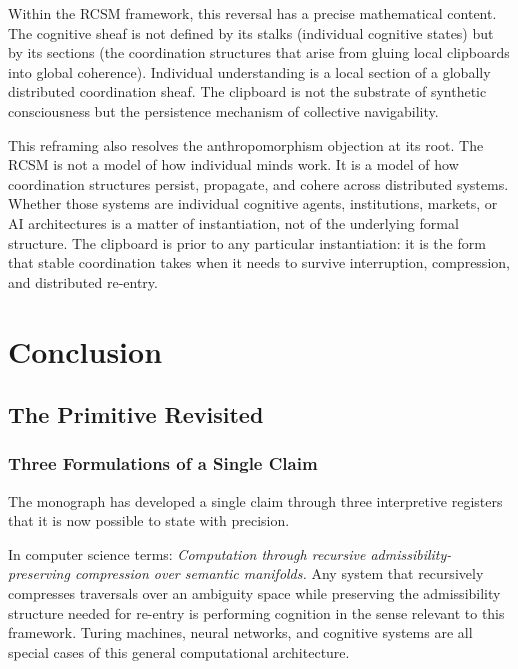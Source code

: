 \documentclass[12pt,oneside]{book}
\theoremstyle{plain}
\theoremstyle{definition}
\theoremstyle{plain}
\begin{document}
Within the RCSM framework, this reversal has a precise mathematical content. The cognitive sheaf is not defined by its stalks (individual cognitive states) but by its sections (the coordination structures that arise from gluing local clipboards into global coherence). Individual understanding is a local section of a globally distributed coordination sheaf. The clipboard is not the substrate of synthetic consciousness but the persistence mechanism of collective navigability.

This reframing also resolves the anthropomorphism objection at its root. The RCSM is not a model of how individual minds work. It is a model of how coordination structures persist, propagate, and cohere across distributed systems. Whether those systems are individual cognitive agents, institutions, markets, or AI architectures is a matter of instantiation, not of the underlying formal structure. The clipboard is prior to any particular instantiation: it is the form that stable coordination takes when it needs to survive interruption, compression, and distributed re-entry.

\part{Conclusion}

\chapter{The Primitive Revisited}
\label{ch:conclusion}

\section{Three Formulations of a Single Claim}

The monograph has developed a single claim through three interpretive registers that it is now possible to state with precision.

In computer science terms: \textit{Computation through recursive admissibility-preserving compression over semantic manifolds.} Any system that recursively compresses traversals over an ambiguity space while preserving the admissibility structure needed for re-entry is performing cognition in the sense relevant to this framework. Turing machines, neural networks, and cognitive systems are all special cases of this general computational architecture.
\end{document}
